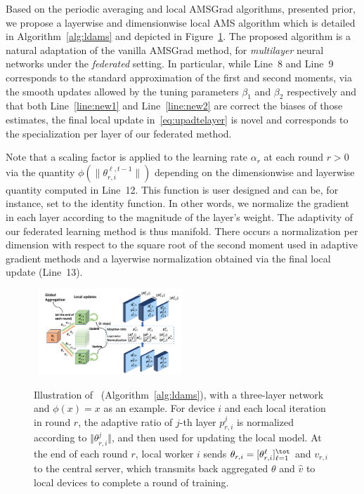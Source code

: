 \documentclass[twoside]{article}
\begin{document}
Based on the periodic averaging and local AMSGrad algorithms, presented prior, we propose a layerwise and dimensionwise local AMS algorithm which is detailed in Algorithm~\ref{alg:ldams} and  depicted in Figure~\ref{fig:illustrate}. The proposed algorithm is a natural adaptation of the vanilla AMSGrad method, for \emph{multilayer} neural networks under the \emph{federated} setting.
In particular, while Line~8 and Line~9 corresponds to the standard approximation of the first and second moments, via the smooth updates allowed by the tuning parameters $\beta_1$ and $\beta_2$ respectively and that both Line~\ref{line:new1} and Line~\ref{line:new2} are correct the biases of those estimates, the final local update in~\eqref{eq:upadtelayer} is novel and corresponds to the specialization per layer of our federated method.


Note that a scaling factor is applied to the learning rate $\alpha_r$ at each round $r>0$ via the quantity $\phi(\|\theta_{r,i}^{\ell,t-1}\|)$ depending on the dimensionwise and layerwise quantity computed in Line~12.
This function is user designed and can be, for instance, set to the identity function. 
In other words, we normalize the gradient in each layer according to the magnitude of the layer's weight.
The adaptivity of our federated learning method is thus manifold. 
There occurs a normalization per dimension with respect to the square root of the second moment used in adaptive gradient methods and a layerwise normalization obtained via the final local update (Line~13).




\begin{figure}[t]
\centering
\mbox{
        \includegraphics[width=0.48\textwidth]{new_figure/plot1.pdf}
}
\vspace{0.1in}
	\caption{Illustration of \algo\ (Algorithm~\ref{alg:ldams}), with a three-layer network and $\phi(x)=x$ as an example. %
		For device $i$ and each local iteration in round $r$, the adaptive ratio of $j$-th layer $p_{r,i}^j$ is normalized according to $\Vert \theta_{r,i}^j\Vert$, and then used for updating the local model. 
	At the end of each round $r$, local worker $i$ sends $\theta_{r,i} =  [\theta_{r,i}^{\ell}]_{\ell =1}^{\tot}$ and $v_{r,i}$ to the central server, which transmits back aggregated $\theta$ and $\hat v$ to local devices to complete a round of training.}
	\label{fig:illustrate}
\end{figure}
\end{document}
